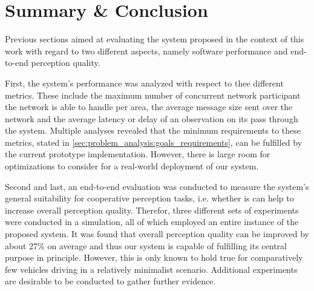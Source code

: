 \section{Summary \& Conclusion}
\label{sec:evaluation:summary_conclusion}
Previous sections aimed at evaluating the system proposed in the context of this work with regard to two different aspects, namely software performance and end-to-end perception quality. 

First, the system's performance was analyzed with respect to thee different metrics. These include the maximum number of concurrent network participant the network is able to handle per area, the average message size sent over the network and the average latency or delay of an observation on its pass through the system. Multiple analyses revealed that the minimum requirements to these metrics, stated in \cref{sec:problem_analysis:goals_requirements}, can be fulfilled by the current prototype implementation. However, there is large room for optimizations to consider for a real-world deployment of our system.

Second and last, an end-to-end evaluation was conducted to measure the system's general suitability for cooperative perception tasks, i.e. whether is can help to increase overall perception quality. Therefor, three different sets of experiments were conducted in a simulation, all of which employed an entire instance of the proposed system. It was found that overall perception quality can be improved by about 27\% on  average and thus our system is capable of fulfilling its central purpose in principle. However, this is only known to hold true for comparatively few vehicles driving in a relatively minimalist scenario. Additional experiments are desirable to be conducted to gather further evidence. 